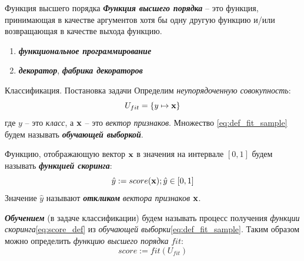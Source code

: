 \documentclass{beamer}
\newcommand{\termdef}[1]{\textbf{\textit{#1}}}
\newcommand{\term}{\textit}
\newcommand{\auditorium}[1]{\color{red}{\textbf{#1}}}
\begin{document}
  
  \begin{frame}{Функция высшего порядка}
  \termdef{Функция высшего порядка} -- это функция, принимающая в качестве аргументов хотя бы одну другую функцию и/или возвращающая в качестве выхода функцию.
  
  \auditorium{ДЗ. см.так же:}
  \begin{enumerate}
  	\item \termdef{функциональное программирование}
  	\item \termdef{декоратор}, \termdef{фабрика декораторов}
  \end{enumerate}
  
  \end{frame}
  
  \begin{frame}{Классификация. Постановка задачи}\label{frame:classification_def}
  	\small
  	Определим \term{неупорядоченную совокупность}:
  	\begin{equation}\label{eq:def_fit_sample}
  	U_{fit} = \left\{ y \mapsto \bold x  \right\}
  	\end{equation}
  	где $y$ -- это \term{класс},
  	а $\bold x$ -- это \term{вектор признаков}.
  	Множество \eqref{eq:def_fit_sample} будем называть \termdef{обучающей выборкой}.
 
  	Функцию, отображающую вектор $\bold x$ в значения на интервале $[0, 1]$ будем 
  	называть \termdef{функцией скоринга}:
  	\begin{equation}\label{eq:score_def}
  	\hat{y} := score( \bold x); \hat{y} \in [0, 1]
  	\end{equation}
  	Значение $\hat{y}$ называют \termdef{откликом} \term{вектора признаков} $\bold x$.
  	
  	\termdef{Обучением} (в задаче классификации) будем называть процесс получения 
  	\term{функции скоринга}\eqref{eq:score_def} 
  	из 
  	\term{обучающей выборки}\eqref{eq:def_fit_sample}.
  	Таким образом можно определить \term{функцию высшего порядка} $fit$:
  	\begin{equation}\label{eq:fit_def}
  	score := fit (U_{fit}) 
  	\end{equation}
  \end{frame}
\end{document}
